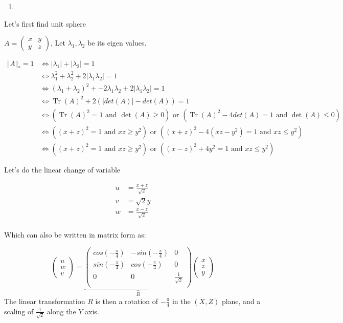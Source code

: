 \documentclass[11pt]{article}
\newcommand{\nucnorm}[1]{\Vert #1 \Vert_*}
\newcommand{\tr}{\operatorname{Tr}}
\begin{document}
\begin{enumerate}
\item 
\end{enumerate}

Let's first find unit sphere

\(A = \begin{pmatrix}x&y\\y&z\end{pmatrix}\), Let \(\lambda_1, \lambda_2\) be its eigen values.

\begin{align*}
\nucnorm{A} = 1
& \iff |\lambda_1| + |\lambda_2| = 1
\\ &\iff \lambda_1^2 + \lambda_2^2 + 2|\lambda_1\lambda_2| = 1
\\ &\iff (\lambda_1 + \lambda_2)^2 + - 2\lambda_1 \lambda_2 + 2 |\lambda_1\lambda_2| = 1
\\ &\iff \tr(A)^2  + 2 (|det(A)| -det(A)) = 1
\\ &\iff (\tr(A)^2  = 1 \text{ and } \det(A) \ge 0) \text{ or }  (\tr(A)^2 - 4 det(A) = 1 \text{ and } \det(A) \le 0)
\\ &\iff ((x+z)^2  = 1 \text{ and } xz \ge y^2) \text{ or }  ((x+z)^2 - 4 (xz-y^2) = 1 \text{ and } xz \le y^2)
\\ &\iff ((x+z)^2  = 1 \text{ and } xz \ge y^2) \text{ or }  ((x-z)^2 + 4 y^2 = 1 \text{ and } xz \le y^2)
\end{align*}


Let's do the linear change of variable

\begin{align*}
u &= \frac{x + z}{\sqrt 2}\\
v &= \sqrt2 y\\
w &= \frac{x - z}{\sqrt 2}\\
\end{align*}

Which can also be written in matrix form as:

\[\begin{pmatrix}u\\w\\v\end{pmatrix}=\underbrace{\begin{pmatrix}
cos(-\frac{\pi}4)&-sin(-\frac{\pi}4)&0\\
sin(-\frac{\pi}4)&cos(-\frac{\pi}4)&0\\
0&0&\frac1{\sqrt2}\\
\end{pmatrix}}_{R}
\begin{pmatrix}x\\z\\y\end{pmatrix}\]
The linear transformation \(R\) is then a rotation of \(-\frac{\pi}4\) in the \((X, Z)\) plane, and a scaling of \(\frac1{\sqrt2}\) along the \(Y\) axis.
\end{document}
